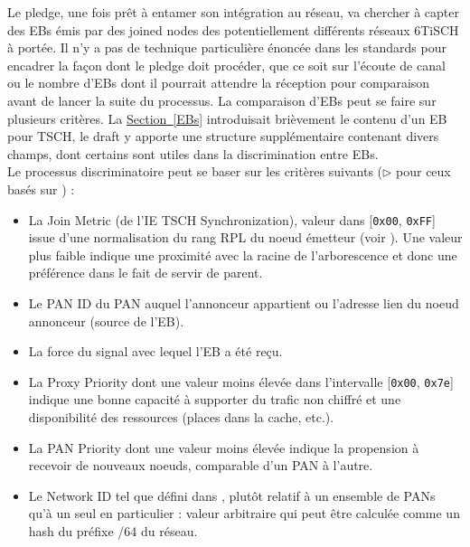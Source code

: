 \documentclass[]{report}
\newcommand{\wordlink}[2]{\hyperref[#2]{#1~\ref{#2}}}
\begin{document}
Le pledge, une fois prêt à entamer son intégration au réseau, va chercher à capter des EBs émis par des joined nodes des potentiellement différents réseaux 6TiSCH à portée. Il n'y a pas de technique particulière énoncée dans les standards pour encadrer la façon dont le pledge doit procéder, que ce soit sur l'écoute de canal ou le nombre d'EBs dont il pourrait attendre la réception pour comparaison avant de lancer la suite du processus. La comparaison d'EBs peut se faire sur plusieurs critères. La \wordlink{Section}{EBs} introduisait brièvement le contenu d'un EB pour TSCH, le draft \cite{ietf-6tisch-enrollment-enhanced-beacon-14} y apporte une structure supplémentaire contenant divers champs, dont certains sont utiles dans la discrimination entre EBs.\\

Le processus discriminatoire peut se baser sur les critères suivants ($\triangleright$ pour ceux basés sur \cite{ietf-6tisch-enrollment-enhanced-beacon-14})  :
\begin{itemize}[label=$\bullet$]
\item La Join Metric (de l'IE TSCH Synchronization), valeur dans [\texttt{0x00}, \texttt{0xFF}] issue d'une normalisation du rang RPL du noeud émetteur (voir \cite{rfc8180}). Une valeur plus faible indique une proximité avec la racine de l'arborescence et donc une préférence dans le fait de servir de parent.
\vspace{0.1cm}
\item Le PAN ID du PAN auquel l'annonceur appartient ou l'adresse lien du noeud annonceur (source de l'EB).
\item La force du signal avec lequel l'EB a été reçu.
\end{itemize} 
\begin{itemize}[label=$\triangleright$]
\item La Proxy Priority dont une valeur moins élevée dans l'intervalle [\texttt{0x00}, \texttt{0x7e}] indique une bonne capacité à supporter du trafic non chiffré et une disponibilité des ressources (places dans la cache, etc.).
\vspace{0.1cm}
\item La PAN Priority dont une valeur moins élevée indique la propension à recevoir de nouveaux noeuds, comparable d'un PAN à l'autre.
\vspace{0.1cm}
\item Le Network ID tel que défini dans \cite{ietf-6tisch-enrollment-enhanced-beacon-14}, plutôt relatif à un ensemble de PANs qu'à un seul en particulier : valeur arbitraire qui peut être calculée comme un hash du préfixe /64 du réseau.
\end{itemize}
\vspace{0.4cm}
\end{document}
